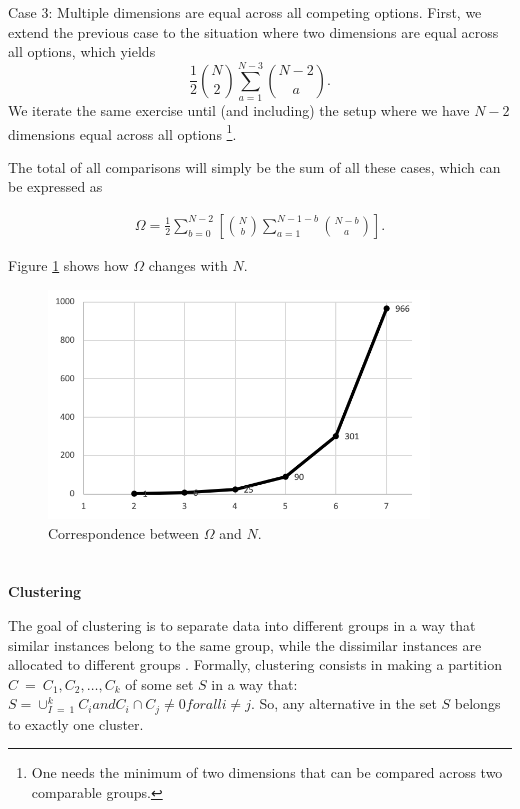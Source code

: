 \documentclass[a4paper,12pt]{article}
\begin{document}
Case 3: Multiple dimensions are equal across all competing options. First, we extend the previous case to the situation where two dimensions are equal across all options, which yields $$\frac{1}{2}\binom{N}{2}\sum_{a=1}^{N-3}{\binom{N-2}{a}}.$$ We iterate the same exercise until (and including) the setup where we have $N-2$ dimensions equal across all options \footnote{One needs the minimum of two dimensions that can be compared across two comparable groups.}. 

The total of all comparisons will simply be the sum of all these cases, which can be expressed as

\begin{align}\label{eq:compromiseEffectDetailedCalculation}
    \Omega=\frac{1}{2}\sum_{b=0}^{N-2}\left[\binom{N}{b}\sum_{a=1}^{N-1-b}\binom{N-b}{a}\right].    
\end{align}


Figure \ref{fig:compromiseComparisonPlot} shows how $\Omega$ changes with $N$.

\begin{figure}[H]
    \centering
    \includegraphics[width=0.9\textwidth]{staticFiles/compromiseComparisonsZakAppendix.png}
    \caption{Correspondence between $\Omega$ and $N$.}
    \label{fig:compromiseComparisonPlot}
\end{figure}


\newpage
\section{}\label{appendix:clusteringAlgorithms}

\textbf{Clustering}

The goal of clustering is to separate data into different groups in a way that similar instances belong to the same group, while the dissimilar instances are allocated to different groups \citep{maimon2005data}. Formally, clustering consists in making a partition $C\ =\ {C_1,C_2,\ldots,C_k}$ of some set $S$ in a way that: $S=\cup_{I\ =\ 1}^kC_i and C_i\cap C_j\neq0 for all i\neq j$. So, any alternative in the set $S$ belongs to exactly one cluster.
\end{document}
